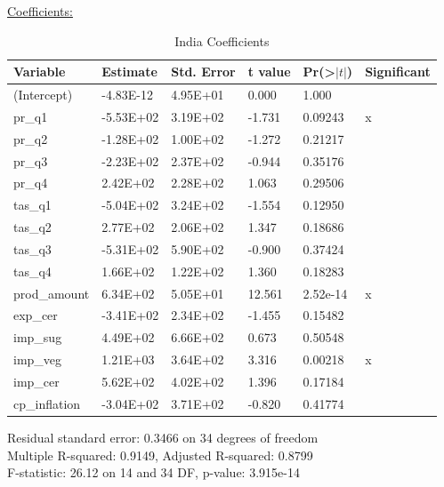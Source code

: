 \documentclass[11pt]{article}
\begin{document}
\underline{Coefficients:}
\FloatBarrier
\begin{table}[!htbp]
\centering
\begin{tabular}{llllll}
\hline
Variable      & Estimate  & Std. Error & t value & Pr(\textgreater$|t|$) & Significant \\ \hline
(Intercept)   & -4.83E-12 & 4.95E+01   & 0.000   & 1.000             &             \\
pr\_q1        & -5.53E+02 & 3.19E+02   & -1.731  & 0.09243             & x           \\
pr\_q2        & -1.28E+02 & 1.00E+02   & -1.272  & 0.21217             &             \\
pr\_q3        & -2.23E+02 & 2.37E+02   & -0.944  & 0.35176             &             \\
pr\_q4        & 2.42E+02  & 2.28E+02   & 1.063   & 0.29506             &             \\
tas\_q1       & -5.04E+02 & 3.24E+02   & -1.554  & 0.12950             &             \\
tas\_q2       & 2.77E+02  & 2.06E+02   & 1.347   & 0.18686             &             \\
tas\_q3       & -5.31E+02 & 5.90E+02   & -0.900  & 0.37424             &             \\
tas\_q4       & 1.66E+02  & 1.22E+02   & 1.360   & 0.18283             &             \\
prod\_amount  & 6.34E+02  & 5.05E+01   & 12.561  & 2.52e-14            & x           \\
exp\_cer      & -3.41E+02 & 2.34E+02   & -1.455  & 0.15482             &             \\
imp\_sug      & 4.49E+02  & 6.66E+02   & 0.673   & 0.50548             &             \\
imp\_veg      & 1.21E+03  & 3.64E+02   & 3.316   & 0.00218             & x           \\
imp\_cer      & 5.62E+02  & 4.02E+02   & 1.396   & 0.17184             &             \\
cp\_inflation & -3.04E+02 & 3.71E+02   & -0.820  & 0.41774             &            \\ \hline
\end{tabular}
\caption{India Coefficients}
\label{table8}
\end{table}
\FloatBarrier
Residual standard error: 0.3466 on 34 degrees of freedom\\
Multiple R-squared:  0.9149, Adjusted R-squared:  0.8799 \\
F-statistic: 26.12 on 14 and 34 DF,  p-value: 3.915e-14
\end{document}
